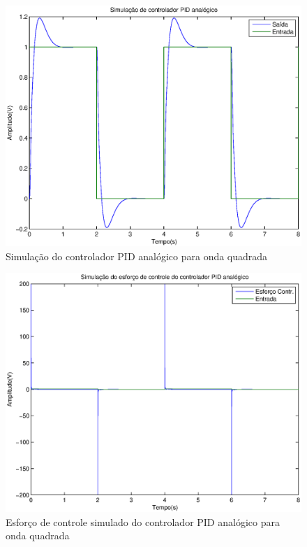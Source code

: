 \documentclass{article}
\begin{document}
\begin{figure}[H]
	\centering
	\includegraphics[width=0.8\linewidth]{yr1000step}
	\caption{Simulação do controlador PID analógico para onda quadrada}
	\label{fig:yrsimpidstep}
\end{figure}
\begin{figure}[H]
	\centering
	\includegraphics[width=0.8\linewidth]{ru1000step}
	\caption{Esforço de controle simulado do controlador PID analógico para onda quadrada}
	\label{fig:rusimpidstep}
\end{figure}
\end{document}
